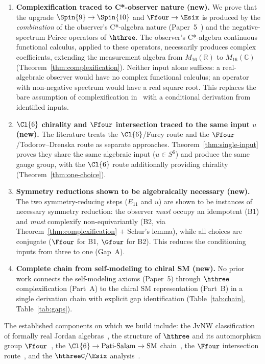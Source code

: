 \begin{enumerate}
\item \textbf{Complexification traced to C*-observer nature (new).}
  We prove that the upgrade $\Spin{9}\to\Spin{10}$ and
  $\Ffour\to\Esix$ is produced by the \emph{combination} of the
  observer's C*-algebra nature (Paper~5~\cite{Paper5}) and the
  negative-spectrum Peirce operators of $\hthree$.  The observer's
  C*-algebra continuous functional calculus, applied to these operators,
  necessarily produces complex coefficients, extending the measurement
  algebra from $M_{16}(\mathbb{R})$ to $M_{16}(\mathbb{C})$
  (Theorem~\ref{thm:complexification}).  Neither input alone
  suffices: a real-algebraic observer would have no complex
  functional calculus; an operator with non-negative spectrum
  would have a real square root.  This replaces the bare
  assumption of complexification in~\cite{Boyle2020} with a
  conditional derivation from identified inputs.

\item \textbf{$\Cl{6}$ chirality and $\Ffour$ intersection traced to
  the same input $u$ (new).}
  The literature treats the $\Cl{6}$/Furey route and the
  $\Ffour$/Todorov--Drenska route as separate approaches.
  Theorem~\ref{thm:single-input} proves they share the same algebraic
  input ($u\in S^6$) and produce the same gauge group, with the
  $\Cl{6}$ route additionally providing chirality
  (Theorem~\ref{thm:one-choice}).

\item \textbf{Symmetry reductions shown to be algebraically necessary (new).}
  The two symmetry-reducing steps ($E_{11}$ and $u$) are shown to be
  instances of necessary symmetry reduction: the observer
  \emph{must} occupy an idempotent (B1) and \emph{must} complexify
  non-equivariantly (B2, via
  Theorem~\ref{thm:complexification} $+$ Schur's lemma), while all
  choices are conjugate ($\Ffour$ for B1, $\Gfour$ for B2).  This
  reduces the conditioning inputs from three to one (Gap~A).

\item \textbf{Complete chain from self-modeling to chiral SM (new).}
  No prior work connects the self-modeling axioms (Paper~5) through
  $\hthree$ complexification (Part~A) to the chiral SM representation
  (Part~B) in a single derivation chain with explicit gap
  identification (Table~\ref{tab:chain}, Table~\ref{tab:gaps}).
\end{enumerate}

\noindent
The established components on which we build include: the JvNW
classification of formally real Jordan
algebras~\cite{JvNW1934,Albert1934}, the structure of $\hthree$ and
its automorphism group $\Ffour$~\cite{Baez2002,Yokota2009}, the
$\Cl{6}\to\text{Pati-Salam}\to\text{SM}$
chain~\cite{Furey2018,Todorov2022}, the $\Ffour$ intersection
route~\cite{TodorovDrenska2018}, and the
$\hthreeC/\Esix$ analysis~\cite{Boyle2020}.

